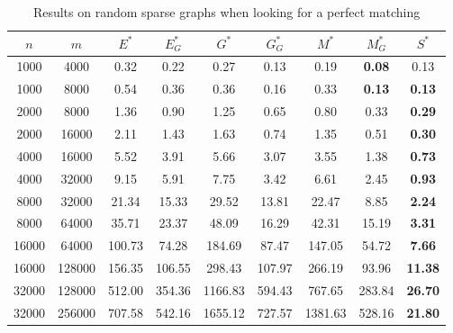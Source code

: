 \begin{table}
\centering
{} {
\begin{tabular}{
cc|ccccccc}
$n$ & $m$ & $E^*$ & $E^*_G$ & $G^*$ & $G^*_G$ & $M^*$ & $M^*_G$ & $S^*$ \\
\hline
1000 & 4000 & 0.32 & 0.22 & 0.27 & 0.13 & 0.19 & \textbf{0.08} & 0.13 \\
1000 & 8000 & 0.54 & 0.36 & 0.36 & 0.16 & 0.33 & \textbf{0.13} & \textbf{0.13} \\
2000 & 8000 & 1.36 & 0.90 & 1.25 & 0.65 & 0.80 & 0.33 & \textbf{0.29} \\
2000 & 16000 & 2.11 & 1.43 & 1.63 & 0.74 & 1.35 & 0.51 & \textbf{0.30} \\
4000 & 16000 & 5.52 & 3.91 & 5.66 & 3.07 & 3.55 & 1.38 & \textbf{0.73} \\
4000 & 32000 & 9.15 & 5.91 & 7.75 & 3.42 & 6.61 & 2.45 & \textbf{0.93} \\
8000 & 32000 & 21.34 & 15.33 & 29.52 & 13.81 & 22.47 & 8.85 & \textbf{2.24} \\
8000 & 64000 & 35.71 & 23.37 & 48.09 & 16.29 & 42.31 & 15.19 & \textbf{3.31} \\
16000 & 64000 & 100.73 & 74.28 & 184.69 & 87.47 & 147.05 & 54.72 & \textbf{7.66} \\
16000 & 128000 & 156.35 & 106.55 & 298.43 & 107.97 & 266.19 & 93.96 & \textbf{11.38} \\
32000 & 128000 & 512.00 & 354.36 & 1166.83 & 594.43 & 767.65 & 283.84 & \textbf{26.70} \\
32000 & 256000 & 707.58 & 542.16 & 1655.12 & 727.57 & 1381.63 & 528.16 & \textbf{21.80} \\
\end{tabular}
}
\caption{Results on random sparse graphs when looking for a perfect matching}\label{tab:perfect_sparse}
\end{table}

